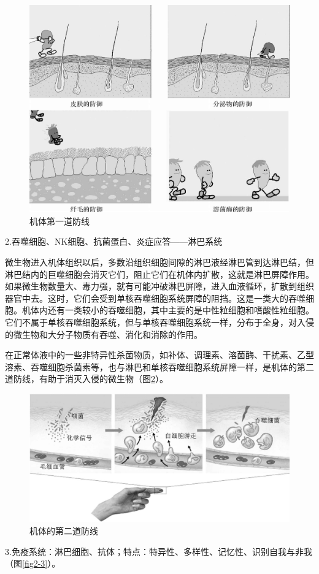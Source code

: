\begin{figure}[!htbp]
 \centering
 \includegraphics[width=.6\textwidth]{./images/Image00026.jpg}
 \caption{机体第一道防线}
 \label{fig2-1}
  \end{figure} 

2.吞噬细胞、NK细胞、抗菌蛋白、炎症应答------淋巴系统

微生物进入机体组织以后，多数沿组织细胞间隙的淋巴液经淋巴管到达淋巴结，但淋巴结内的巨噬细胞会消灭它们，阻止它们在机体内扩散，这就是淋巴屏障作用。如果微生物数量大、毒力强，就有可能冲破淋巴屏障，进入血液循环，扩散到组织器官中去。这时，它们会受到单核吞噬细胞系统屏障的阻挡。这是一类大的吞噬细胞。机体内还有一类较小的吞噬细胞，其中主要的是中性粒细胞和嗜酸性粒细胞。它们不属于单核吞噬细胞系统，但与单核吞噬细胞系统一样，分布于全身，对入侵的微生物和大分子物质有吞噬、消化和消除的作用。

在正常体液中的一些非特异性杀菌物质，如补体、调理素、溶菌酶、干扰素、乙型溶素、吞噬细胞杀菌素等，也与淋巴和单核吞噬细胞系统屏障一样，是机体的第二道防线，有助于消灭入侵的微生物（图\ref{fig2-2}）。

\begin{figure}[!htbp]
 \centering
 \includegraphics[width=.6\textwidth]{./images/Image00027.jpg}
 \caption{机体的第二道防线}
 \label{fig2-2}
  \end{figure} 

3.免疫系统：淋巴细胞、抗体；特点：特异性、多样性、记忆性、识别自我与非我（图\ref{fig2-3}）。

